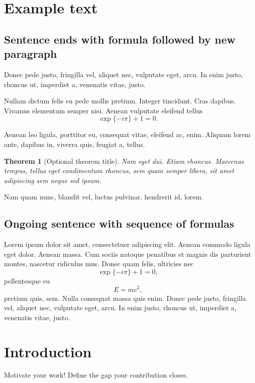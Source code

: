 \documentclass[
	12pt, %
	a4paper, %
	]{article}
\theoremstyle{break} %
\newtheorem{theorem}{Theorem}
\begin{document}
\setcounter{page}{2}
\onehalfspacing

\section{Example text}\label{sec:examples}
\subsection{Sentence ends with formula followed by new paragraph}
Donec pede justo, fringilla vel, aliquet nec, vulputate eget, arcu. In enim justo, rhoncus ut, imperdiet a, venenatis vitae, justo. 

Nullam dictum felis eu pede mollis pretium. Integer tincidunt. Cras dapibus. Vivamus elementum semper nisi. Aenean vulputate eleifend tellus
\begin{equation}
\exp\{-i\pi\} + 1 = 0.
\end{equation}

Aenean leo ligula, porttitor eu, consequat vitae, eleifend ac, enim. Aliquam lorem ante, dapibus in, viverra quis, feugiat a, tellus.
\begin{theorem}[Optional theorem title]
	Nam eget dui. Etiam rhoncus. Maecenas tempus, tellus eget condimentum rhoncus, sem quam semper libero, sit amet adipiscing sem neque sed ipsum.
\end{theorem} Nam quam nunc, blandit vel, luctus pulvinar, hendrerit id, lorem.

\subsection{Ongoing sentence  with sequence of formulas}
Lorem ipsum dolor sit amet, consectetuer adipiscing elit. Aenean commodo ligula eget dolor. Aenean massa. Cum sociis natoque penatibus et magnis dis parturient montes, nascetur ridiculus mus. Donec quam felis, ultricies nec
\begin{equation}
\exp\{-i\pi\} + 1 = 0,
\end{equation}
pellentesque eu
\begin{equation}
E = m c^2,
\end{equation}
pretium quis, sem. Nulla consequat massa quis enim. Donec pede justo, fringilla vel, aliquet nec, vulputate eget, arcu. In enim justo, rhoncus ut, imperdiet a, venenatis vitae, justo.

\section{Introduction} \label{sec:introduction}
Motivate your work! Define the gap your contribution closes.
\end{document}
